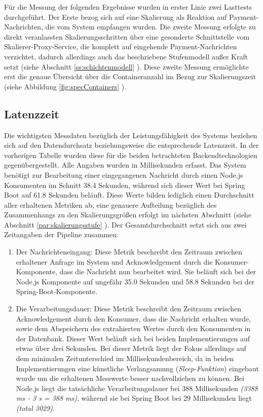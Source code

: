 Für die Messung der folgenden Ergebnisse wurden in erster Linie zwei Lasttests durchgeführt. Der Erste bezog sich auf eine Skalierung als Reaktion auf Payment-Nachrichten, die vom System empfangen wurden. Die zweite Messung erfolgte zu direkt veranlassten Skalierungsschritten über eine gesonderte Schnittstelle vom Skalierer-Proxy-Service, die komplett auf eingehende Payment-Nachrichten verzichtet, dadurch allerdings auch das beschriebene Stufenmodell außer Kraft setzt (siehe Abschnitt \ref{ss:schichtenmodell} ). Diese zweite Messung ermöglichte erst die genaue Übersicht über die Containeranzahl im Bezug zur Skalierungszeit (siehe Abbildung \ref{fig:specContainers} ).


\subsection{Latenzzeit}
Die wichtigsten Messdaten bezüglich der Leistungsfähigkeit des Systems beziehen sich auf den Datendurchsatz beziehungsweise die entsprechende Latenzzeit. In der vorherigen Tabelle wurden diese für die beiden betrachteten Backendtechnologien gegenübergestellt. Alle Angaben wurden in Millisekunden erfasst. Das System benötigt zur Bearbeitung einer eingegangenen Nachricht durch einen Node.js Konsumenten im Schnitt 38.4 Sekunden, während sich dieser Wert bei Spring Boot auf 61.8 Sekunden beläuft. Diese Werte bilden lediglich einen Durchschnitt aller erhaltenen Metriken ab, eine genauere Aufteilung bezüglich des Zusammenhangs zu den Skalierungsgrößen erfolgt im nächsten Abschnitt (siehe Abschnitt \ref{par:skalierungsstufe} ). Der Gesamtdurchschnitt setzt sich aus zwei Zeitangaben der Pipeline zusammen: 

\begin{enumerate}
  \item Der Nachrichteneingang: Diese Metrik beschreibt den Zeitraum zwischen erhaltener Anfrage im System und Acknowledgement durch die Konsumer-Komponente, dass die Nachricht nun bearbeitet wird. Sie beläuft sich bei der Node.js Komponente auf ungefähr 35.0 Sekunden und 58.8 Sekunden bei der Spring-Boot-Komponente. 
  \item Die Verarbeitungsdauer: Diese Metrik beschreibt den Zeitraum zwischen Acknowledgement durch den Konsumer, dass die Nachricht erhalten wurde, sowie dem Abspeichern des extrahierten Wertes durch den Konsumenten in der Datenbank. Dieser Wert beläuft sich bei beiden Implementierungen auf etwas über drei Sekunden. Bei dieser Metrik liegt der Fokus allerdings auf dem minimalen Zeitunterschied im Millisekundenbereich, da in beiden Implementierungen eine künstliche Verlangsamung (\emph{Sleep-Funktion}) eingebaut wurde um die erhaltenen Messwerte besser nachvollziehen zu können. Bei Node.js liegt die tatsächliche Verarbeitungsdauer bei 388 Millisekunden \emph{(3388 ms - 3 s = 388 ms)}, während sie bei Spring Boot bei 29 Millisekunden liegt \emph{(total 3029)}.
\end{enumerate}

